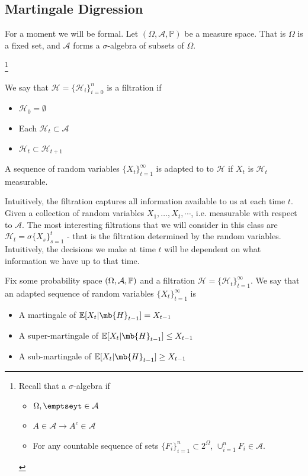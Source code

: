 
\subsection{Martingale Digression}

For a moment we will be formal. Let $(\Omega, \mathcal{A}, \mathbb{P})$ be a measure space. That is $\Omega$ is a fixed set, and $\mathcal{A}$ forms a $\sigma$-algebra of subsets of $\Omega$.

\footnote{Recall that a $\sigma$-algebra if \begin{itemize}\item $\Omega, \emptseyt\in \mathcal{A}$ \item $A\in \mathcal{A} \rightarrow A^c\in \mathcal{A}$ \item For any countable sequence of sets $\{F_i\}_{i=1}^n\subset 2^{\Omega}$, $\cup_{i=1}^n F_i\in \mathcal{A}$. \end{itemize}}

\begin{definition}
We say that $\mathcal{H} = \{\mathcal{H}_i\}_{i=0}^n$ is a filtration if 
\begin{itemize}
    \item $\mathcal{H}_0 = \emptyset $
    \item Each $\mathcal{H}_t\subset \mathcal{A}$
    \item $\mathcal{H}_t\subset \mathcal{H}_{t+1}$
\end{itemize}

A sequence of random variables $\{X_t\}_{t=1}^{\infty}$ is adapted to to $\mathcal{H}$ if $X_t$ is $\mathcal{H}_t$ measurable. 
\end{definition}
Intuitively, the filtration captures all information available to us at each time $t$. Given a collection of random variables $X_1, \dots, X_t, \cdots$, i.e. measurable with respect to $\mathcal{A}$. The most interesting filtrations that we will consider in this class are $\mathcal{H}_t = \sigma\{X_{s}\}_{s=1}^t$ - that is the filtration determined by the random variables. Intuitively, the decisions we make at time $t$ will be dependent on what information we have up to that time. 

\begin{definition}
    Fix some probability space $(\Omega, \mathcal{A}, \mathbb{P})$ and a filtration $\mathcal{H} = \{\mathcal{H}_t\}_{t=1}^{\infty}$. We say that an adapted sequence of random variables $\{X_t\}_{t=1}^{\infty}$ is 
    \begin{itemize}
        \item A martingale of $\E[X_{t}|\mb{H}_{t-1}] = X_{t-1}$
        \item A super-martingale of $\E[X_{t}|\mb{H}_{t-1}] \leq X_{t-1}$
        \item A sub-martingale of $\E[X_{t}|\mb{H}_{t-1}] \geq X_{t-1}$
    \end{itemize}    
\end{definition}


